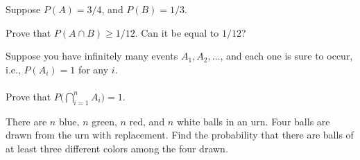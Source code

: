 \begin{problem}
  Suppose \(P(A)=3/4\), and \(P(B)=1/3\).

  Prove that \(P(A\cap B)\geq 1/12\). Can it be equal to \(1/12\)?
\end{problem}
\begin{solution}

\end{solution}
\newpage

\begin{problem}
  Suppose you have infinitely many events \(A_1,A_2,\dotsc\), and each one
  is sure to occur, i.e., \(P(A_i)=1\) for any \(i\).
  \\\\
  Prove that \(P\bigl(\bigcap_{i=1}^n A_i\bigr)=1\).
\end{problem}
\begin{solution}

\end{solution}
\newpage

\begin{problem}
  There are \(n\) blue, \(n\) green, \(n\) red, and \(n\) white balls in an
  urn. Four balls are drawn from the urn with replacement. Find the
  probability that there are balls of at least three different colors among
  the four drawn.
\end{problem}
\begin{solution}

\end{solution}

